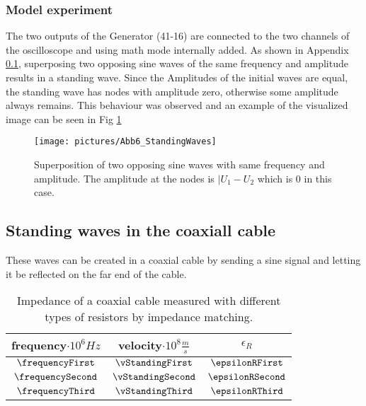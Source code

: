 \documentclass[a4paper,10pt,twocolumn]{article}
\begin{document}
    \subsubsection{Model experiment}
    The two outputs of the Generator (41-16) are connected to the two channels of the oscilloscope and using math mode internally added.
    As shown in Appendix \ref{}, superposing two opposing sine waves of the same frequency and amplitude results in a standing wave.
    Since the Amplitudes of the initial waves are equal, the standing wave has nodes with amplitude zero, otherwise some amplitude always remains.
    This behaviour was observed and an example of the visualized image can be seen in Fig \ref{fig:standingWaves}
    \begin{figure}[htbp]
        \begin{center}
            \texttt{[image: pictures/Abb6\_StandingWaves]}
            \caption[]{Superposition of two opposing sine waves with same frequency and amplitude. The amplitude at the nodes is $|U_1 - U_2$ which is 0 in this case.}   %
            \label{fig:standingWaves}
        \end{center}
    \end{figure}
    \subsection{Standing waves in the coaxiall cable}
    These waves can be created in a coaxial cable by sending a sine signal and letting it be reflected on the far end of the cable.
    \begin{table}[htbp]          %
        \tiny
        \centering
        \fontsize{8pt}{8pt}
        \begin{tabular*}{\linewidth}{@{\extracolsep{\fill}}ccc}
            \hline
            \hline
            \rule[-5pt]{0pt}{23pt}  frequency$\cdot 10^6 Hz$  & velocity$\cdot10^8 \frac{m}{s}$ & $\epsilon_R$   	 \\
            \hline
            \rule[-5pt]{0pt}{23pt}   $\frequencyFirst$ & $\vStandingFirst$ &   $\epsilonRFirst$  	 \\
            \rule[-5pt]{0pt}{23pt}    $\frequencySecond$ & $\vStandingSecond$ &   $\epsilonRSecond$  	 \\
            \rule[-5pt]{0pt}{23pt}   $\frequencyThird$ & $\vStandingThird$ &   $\epsilonRThird$  	 \\
            \hline
            \hline
        \end{tabular*}
        \normalsize
        \caption[]{Impedance of a coaxial cable measured with different types of resistors by impedance matching.}  %
        \label{tab:standingWaveData}                             %
    \end{table} 
    
    
\end{document}
